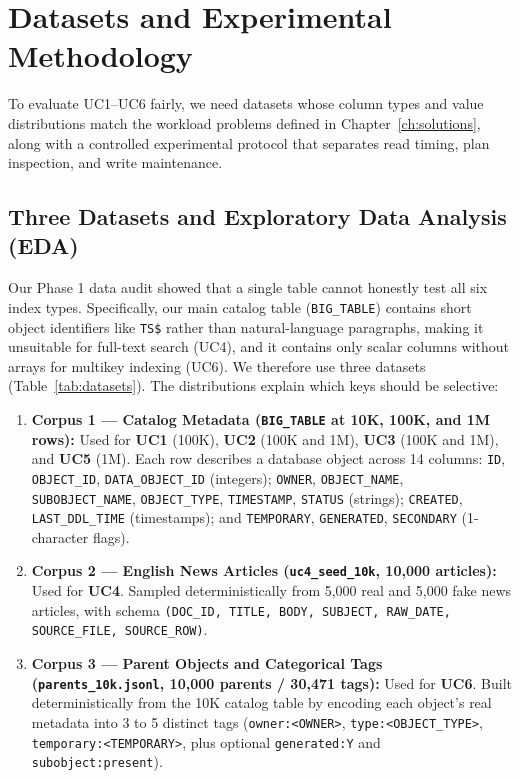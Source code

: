 \chapter{Datasets and Experimental Methodology}
\label{ch:methodology}

To evaluate UC1--UC6 fairly, we need datasets whose column types and value distributions match the workload problems defined in Chapter~\ref{ch:solutions}, along with a controlled experimental protocol that separates read timing, plan inspection, and write maintenance.

\section{Three Datasets and Exploratory Data Analysis (EDA)}
Our Phase 1 data audit showed that a single table cannot honestly test all six index types. Specifically, our main catalog table (\texttt{BIG\_TABLE}) contains short object identifiers like \texttt{TS\$} rather than natural-language paragraphs, making it unsuitable for full-text search (UC4), and it contains only scalar columns without arrays for multikey indexing (UC6). We therefore use three datasets (Table~\ref{tab:datasets}). The distributions explain which keys should be selective:

\begin{enumerate}
\item \textbf{Corpus 1 --- Catalog Metadata (\texttt{BIG\_TABLE} at 10K, 100K, and 1M rows):} Used for \textbf{UC1} (100K), \textbf{UC2} (100K and 1M), \textbf{UC3} (100K and 1M), and \textbf{UC5} (1M). Each row describes a database object across 14 columns: \texttt{ID}, \texttt{OBJECT\_ID}, \texttt{DATA\_OBJECT\_ID} (integers); \texttt{OWNER}, \texttt{OBJECT\_NAME}, \texttt{SUBOBJECT\_NAME}, \texttt{OBJECT\_TYPE}, \texttt{TIMESTAMP}, \texttt{STATUS} (strings); \texttt{CREATED}, \texttt{LAST\_DDL\_TIME} (timestamps); and \texttt{TEMPORARY}, \texttt{GENERATED}, \texttt{SECONDARY} (1-character flags).
\item \textbf{Corpus 2 --- English News Articles (\texttt{uc4\_seed\_10k}, 10,000 articles):} Used for \textbf{UC4}. Sampled deterministically from 5,000 real and 5,000 fake news articles, with schema \texttt{(DOC\_ID, TITLE, BODY, SUBJECT, RAW\_DATE, SOURCE\_FILE, SOURCE\_ROW)}.
\item \textbf{Corpus 3 --- Parent Objects and Categorical Tags (\texttt{parents\_10k.jsonl}, 10,000 parents / 30,471 tags):} Used for \textbf{UC6}. Built deterministically from the 10K catalog table by encoding each object's real metadata into 3 to 5 distinct tags (\texttt{owner:<OWNER>}, \texttt{type:<OBJECT\_TYPE>}, \texttt{temporary:<TEMPORARY>}, plus optional \texttt{generated:Y} and \texttt{subobject:present}).
\end{enumerate}

